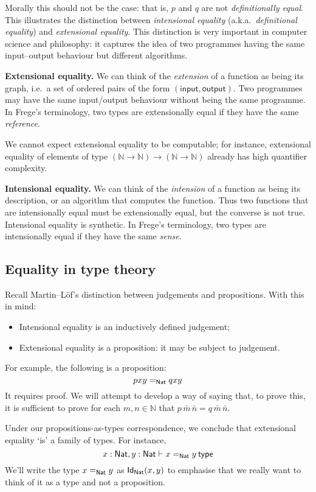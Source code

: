 \documentclass[12pt]{article}
\begin{document}
Morally this should not be the case: that is, $p$ and $q$ are not \emph{definitionally equal}. This illustrates the distinction between \emph{intensional equality} (a.k.a.\ \emph{definitional equality}) and \emph{extensional equality}. This distinction is very important in computer science and philosophy: it captures the idea of two programmes having the same input--output behaviour but different algorithms.

\textbf{Extensional equality.} We can think of the \emph{extension} of a function as being its graph, i.e.\ a set of ordered pairs of the form $(\mathsf{input},\mathsf{output})$. Two programmes may have the same input/output behaviour without being the same programme. In Frege's terminology, two types are extensionally equal if they have the same \emph{reference}.

We cannot expect extensional equality to be computable; for instance, extensional equality of elements of type $(\mathbb{N} \to \mathbb{N}) \to (\mathbb{N} \to \mathbb{N})$ already has high quantifier complexity.

\textbf{Intensional equality.} We can think of the \emph{intension} of a function as being its description, or an algorithm that computes the function. Thus two functions that are intensionally equal must be extensionally equal, but the converse is not true. Intensional equality is synthetic. In Frege's terminology, two types are intensionally equal if they have the same \emph{sense}.

\subsection{Equality in type theory}
Recall Martin--L\"{o}f's distinction between judgements and propositions. With this in mind:
\begin{itemize}
\item Intensional equality is an inductively defined judgement;
\item Extensional equality is a proposition: it may be subject to judgement.
\end{itemize}
For example, the following is a proposition:
\begin{equation*}
pxy =_{\mathsf{Nat}} qxy
\end{equation*}
It requires proof. We will attempt to develop a way of saying that, to prove this, it is sufficient to prove for each $m,n \in \mathbb{N}$ that $p\, \bar m\, \bar n = q\, \bar m\, \bar n$.

Under our propositions-as-types correspondence, we conclude that extensional equality `is' a family of types. For instance,
\begin{equation} \label{eq:equalityAsType}
x : \Nat, y : \Nat \vdash x =_{\Nat} y \type
\end{equation}
We'll write the type $x =_{\mathsf{Nat}} y$ as $\mathsf{Id}_{\mathsf{Nat}}(x,y)$ to emphasise that we really want to think of it as a type and not a proposition.
\end{document}
